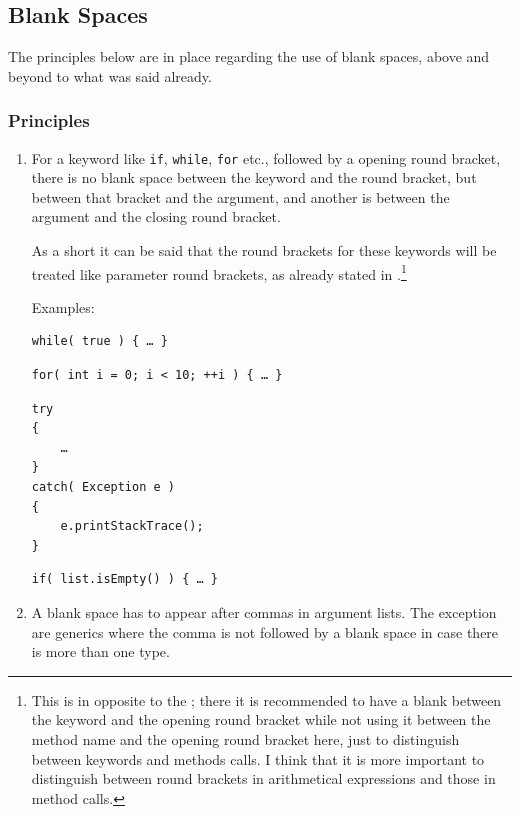 \subsection{Blank Spaces}\label{BlankSpaces}The principles below are in place regarding the use of blank spaces, above and beyond to what was said already.

\subsubsection{Principles}
\begin{enumerate}[label=P\arabic*.]
\item{For a keyword like \lstinline|if|, \lstinline|while|, \lstinline|for| etc., followed by a opening round bracket, there is no blank space between the keyword and the round bracket, but  between that bracket and the argument, and another is between the argument and the closing round bracket. 

As a short it can be said that the round brackets for these keywords will be treated like parameter round brackets, as already stated in .\footnote{This is in opposite to the \ccjpl; there it is recommended to have a blank between the keyword and the opening round bracket while not using it between the method name and the opening round bracket here, just to distinguish between keywords and methods calls. I think that it is more important to distinguish between round brackets in arithmetical expressions and those in method calls.}

Examples:
\begin{lstlisting} 
while( true ) { … }
\end{lstlisting}
\begin{lstlisting} 
for( int i = 0; i < 10; ++i ) { … }
\end{lstlisting}
\begin{lstlisting} 
try
{
    …
}
catch( Exception e )
{
    e.printStackTrace();
}
\end{lstlisting}
\begin{lstlisting} 
if( list.isEmpty() ) { … }
\end{lstlisting}}

\item{A blank space has to appear after commas in argument lists. The exception are generics where the comma is not followed by a blank space in case there is more than one type.

}
\end{enumerate}
